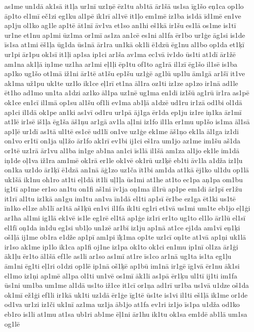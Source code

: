 {as1me
un1dā
ak1sā
it1ļa
ur1nī
uz1ņē
ēz1tu
ab1tā
ār1šā
us1sa
īg1šo
eņ1ca
op1lo
āp1to
el1mī
eč1zi
eg1ku
al1pē
ik1rī
al1vē
it1ļo
em1mē
iz1ba
is1dā
īd1mē
en1ve
ap1ju
ol1ko
ag1le
ap1tē
āt1nī
āv1va
et1so
an1hi
eš1kā
ir1šu
es1lā
os1me
is1tī
ur1ne
et1nu
ap1mi
ūz1ma
or1mī
as1za
an1cē
es1ni
al1fa
ēr1bo
ur1ģe
āg1si
is1de
īs1sa
at1mi
ēš1ļa
ūg1da
ūs1nā
ār1ra
un1kā
ok1li
ē1dzū
ēg1nu
al1bo
op1da
et1ķī
ur1pi
ār1pu
ok1sī
it1ļi
ap1sa
ip1ci
ar1ša
av1ma
ec1vā
iv1do
ūs1ti
at1dī
ār1žē
am1na
ak1ļā
iņ1me
uz1ha
ar1mi
eļ1ļi
ēp1tu
of1to
ag1rā
il1zī
ēg1šo
il1sē
is1ba
ap1ko
ug1šo
ot1mā
iž1ni
ār1tē
at1šu
ep1šu
uz1ģē
ag1lū
up1lu
ām1gā
ar1šī
it1ve
ak1ma
už1pu
uk1te
uz1lo
ik1ce
eļ1rī
et1na
āl1ra
oz1ti
iz1ze
ap1zo
ir1nā
ad1le
ēt1ho
ad1mo
un1ta
a1dzi
az1ko
āl1pa
uz1nē
ug1ma
en1di
iz1šū
ag1rū
īr1ra
as1pē
ok1ce
en1cī
il1mā
op1su
al1šu
of1li
ev1ma
ab1ļā
a1dzē
ud1ru
ir1zā
od1bi
ol1dā
ap1ci
il1dā
ok1pe
an1ki
as1vī
od1ru
ur1pā
āj1ga
ēr1da
ep1ju
iz1re
iņ1ka
ār1mī
at1lē
ir1sē
iš1ļa
ēg1ša
āš1ņu
ar1gā
av1la
aļ1ni
iz1fo
il1la
er1mu
up1šo
is1ma
āl1sā
ap1ļē
ur1dī
as1tā
ul1tē
es1cē
ud1lī
on1ve
uz1ģe
ek1me
āš1ņo
ek1la
āl1ga
iz1di
on1vo
er1tī
on1ja
uļ1žo
ār1fo
ak1rī
ev1bi
ij1ci
eš1ra
um1jo
az1me
im1šu
aš1da
or1tē
uz1rā
ār1vu
al1ba
in1ge
ab1na
an1ci
īs1lā
il1šā
am1za
al1jo
ek1le
im1dā
iņ1de
oļ1va
iž1ra
am1mē
ok1rā
er1le
ok1vē
ok1rū
uz1ķē
eb1ti
āv1la
a1dža
iz1ļu
on1ka
uz1do
ār1ķī
ē1dzā
an1nā
āģ1zo
uz1ča
īt1bi
am1da
at1kā
ēj1ko
ul1du
op1lā
uk1šā
ik1nu
oh1ro
at1ti
eļ1dā
it1li
uļ1ļa
ūs1mi
at1he
at1to
ec1pa
aņ1pa
om1bu
ig1tī
ap1me
er1so
an1tu
on1fi
aš1ni
īv1ja
oņ1ma
il1rū
ap1pe
em1di
ār1pī
er1žu
it1rī
al1tu
iz1kā
an1gu
im1tu
an1va
īn1dā
el1ti
ap1sī
ēr1be
ez1ga
ēt1ki
us1tē
īn1ko
el1ze
ab1lī
ar1tā
aš1ķū
en1vi
il1fa
ik1ti
eg1ri
et1vā
us1mi
um1te
eb1jo
eļ1ģi
ar1ha
al1mi
ig1lā
ek1vē
is1le
eg1rē
el1tā
ap1ģe
iz1ri
er1to
ug1to
el1lo
ār1lū
el1sī
el1fī
oņ1da
in1du
eg1si
ub1ļo
un1zē
ar1bī
iz1ju
ap1nā
at1ce
ej1da
am1vī
eņ1ķi
oš1ļā
ij1me
ob1ra
e1dže
ap1pī
am1pi
īķ1ma
op1te
uz1cī
oņ1te
at1vā
ap1ņi
uk1lā
ir1so
ak1me
ip1lo
ik1ca
ap1fi
oj1ne
iz1pa
ok1to
ok1ci
en1mu
ip1nī
ol1za
ār1ģi
āk1ļu
ēr1to
āl1šā
ef1le
as1li
ar1so
as1mī
at1re
īs1co
ar1nā
ug1ta
is1ta
eg1ļu
ām1ni
ēg1ti
eļ1ri
o1dzi
op1lē
ip1nā
oš1ķē
ap1bū
im1nā
ir1gē
īg1vā
ēr1nu
āk1si
el1mo
iz1ņi
ap1mē
al1pa
ol1ti
un1vē
os1mī
āk1li
as1pā
ēr1ķu
ul1tī
ij1ti
im1fa
ūs1ni
um1ba
um1me
al1dā
us1to
iž1ce
it1cī
or1ņa
ad1rī
ur1ba
us1vā
u1dze
oš1da
ok1mī
ež1ģi
ef1li
ir1kā
uk1ti
uz1dā
ēr1ģe
īg1tē
ūs1te
is1vi
il1ti
eš1ļā
ik1me
or1de
od1va
ur1zi
iz1či
uk1nī
az1ma
uz1ja
āb1jo
at1fa
ev1ri
iz1jo
īs1pa
u1dža
od1ko
eb1ro
is1li
at1mu
at1sa
ub1ri
ab1me
ēļ1ni
ār1hu
ik1tu
ok1sa
em1dē
ab1lā
um1sa
og1lē
}

